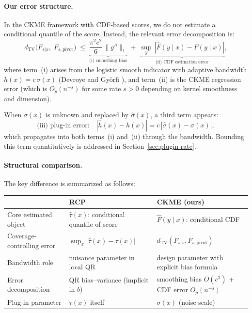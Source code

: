 \documentclass[11pt]{article}
\theoremstyle{remark}
\begin{document}
\paragraph{Our error structure.}
In the CKME framework with CDF-based scores, we do not estimate a
conditional quantile of the score. Instead, the relevant error
decomposition is:
\begin{equation}
\label{eq:our-error}
  d_{\mathrm{TV}}\bigl(F_{s|x},\; F_{s,\mathrm{pivot}}\bigr)
  \;\le\;
  \underbrace{\frac{\pi^2 c^2}{6}\,\|g''\|_1}_{\text{(i) smoothing bias}}
  \;+\;
  \underbrace{\sup_y\,|\hat F(y\mid x) - F(y\mid x)|}_{\text{(ii) CDF estimation error}},
\end{equation}
where term~(i) arises from the logistic smooth indicator with adaptive
bandwidth $h(x) = c\,\sigma(x)$ (Devroye and Gy\"{o}rfi \cite{DG85}),
and term~(ii) is the CKME regression error (which is $O_p(n^{-s})$
for some rate $s > 0$ depending on kernel smoothness and dimension).

When $\sigma(x)$ is unknown and replaced by $\hat\sigma(x)$, a third
term appears:
\begin{equation}
\label{eq:plugin-error}
  \text{(iii) plug-in error:}\quad
  |\hat h(x) - h(x)| = c\,|\hat\sigma(x) - \sigma(x)|,
\end{equation}
which propagates into both terms~(i) and~(ii) through the
bandwidth. Bounding this term quantitatively is addressed in
Section~\ref{sec:plugin-rate}.

\paragraph{Structural comparison.}
The key difference is summarized as follows:

\begin{center}
\small
\begin{tabular}{@{}lll@{}}
\toprule
  & \textbf{RCP} & \textbf{CKME (ours)} \\
\midrule
Core estimated object
  & $\hat\tau(x)$: conditional quantile of score
  & $\hat F(y \mid x)$: conditional CDF \\
Coverage-controlling error
  & $\sup_x |\hat\tau(x) - \tau(x)|$
  & $d_{\mathrm{TV}}(F_{s|x}, F_{s,\mathrm{pivot}})$ \\
Bandwidth role
  & nuisance parameter in local QR
  & design parameter with explicit bias formula \\
Error decomposition
  & QR bias--variance (implicit in $b$)
  & smoothing bias $O(c^2)$ + CDF error $O_p(n^{-s})$ \\
Plug-in parameter
  & $\tau(x)$ itself
  & $\sigma(x)$ (noise scale) \\
\bottomrule
\end{tabular}
\end{center}
\end{document}
